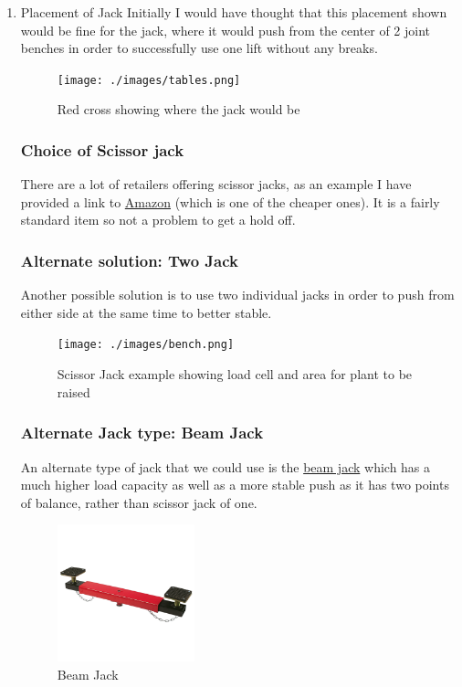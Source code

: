 \documentclass[11pt]{article}
\begin{document}
\begin{enumerate}
\item Placement of Jack
\label{sec-1-2-0-1}
Initially I would have thought that this placement shown would be fine for the jack, where it would push from the center of 2 joint benches 
in order to successfully use one lift without any breaks. 


\begin{figure}[htb]
\centering
\texttt{[image: ./images/tables.png]}
\caption{\label{fig:Jack-location}Red cross showing where the jack would be}
\end{figure}


\subsubsection{Choice of Scissor jack}
\label{sec-1-2-1}

There are a lot of retailers offering scissor jacks, as an example I have provided a link to \href{https://www.amazon.co.uk/3M-66183c-Tonne-Scissor-Jack/dp/B002NUBHAM}{Amazon} (which is one of the cheaper ones). 
It is a fairly standard item so not a problem to get a hold off. 

\subsubsection{Alternate solution: Two Jack}
\label{sec-1-2-2}
Another possible solution is to use two individual jacks in order to push from either side at the same time to better stable.
\begin{figure}[htb]
\centering
\texttt{[image: ./images/bench.png]}
\caption{\label{fig:Scissor-Jack}Scissor Jack example showing load cell and area for plant to be raised}
\end{figure}

\subsubsection{Alternate Jack type: Beam Jack}
\label{sec-1-2-3}

An alternate type of jack that we could use is the \href{http://www.screwfix.com/p/hilka-pro-craft-2-tonne-jacking-beam/21536}{beam jack} which has a much higher load capacity as well as 
a more stable push as it has two points of balance, rather than scissor jack of one. 

\begin{figure}[htb]
\centering
\includegraphics[width=150px]{./images/beamjack.jpg}
\caption{\label{fig:-Beam-Jack}Beam Jack}
\end{figure}




\end{enumerate}
\end{document}
